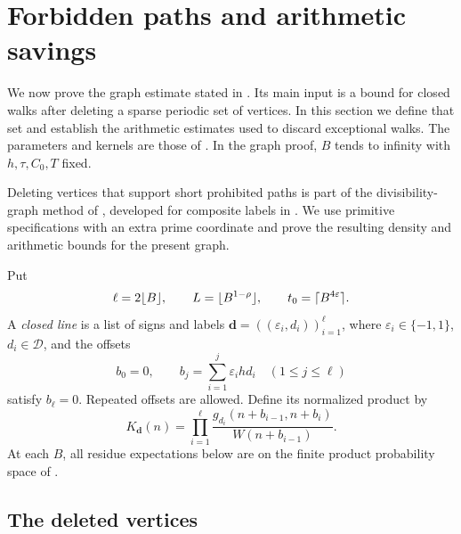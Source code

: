 \section{Forbidden paths and arithmetic savings}\label{sec:paths}

We now prove the graph estimate stated in
.  Its main input is a bound for closed
walks after deleting a sparse periodic set of vertices.  In this
section we define that set and establish the arithmetic estimates
used to discard exceptional walks.  The parameters and kernels are
those of .  In the graph proof, $B$ tends to
infinity with $h,\tau,C_0,T$ fixed.

Deleting vertices that support short prohibited paths is part of the
divisibility-graph method of \cite[Section~4]{HR21}, developed for
composite labels in \cite[Sections~7 and~13.1]{Pilatte26}.
We use primitive specifications with an extra prime coordinate and prove
the resulting density and arithmetic bounds for the present graph.

Put
\begin{equation}\label{eq:trace-parameters}
 \ell=2\lfloor B\rfloor,\qquad
 L=\lfloor B^{1-\rho}\rfloor,\qquad
 t_0=\lceil B^{4\varepsilon}\rceil.
\end{equation}
A \emph{closed line} is a list of signs and labels
$\boldsymbol d=((\varepsilon_i,d_i))_{i=1}^{\ell}$, where
$\varepsilon_i\in\{-1,1\}$, $d_i\in\mathcal D$, and the offsets
\[
 b_0=0,\qquad b_j=\sum_{i=1}^j\varepsilon_i h d_i
 \quad(1\le j\le\ell)
\]
satisfy $b_\ell=0$.  Repeated offsets are allowed.  Define its
normalized product by
\begin{equation}\label{eq:trace-kernel}
 K_{\boldsymbol d}(n)
   =\prod_{i=1}^{\ell}
     \frac{g_{d_i}(n+b_{i-1},n+b_i)}{W(n+b_{i-1})}.
\end{equation}
At each $B$, all residue expectations below are on the finite product
probability space of .

\subsection{The deleted vertices}

